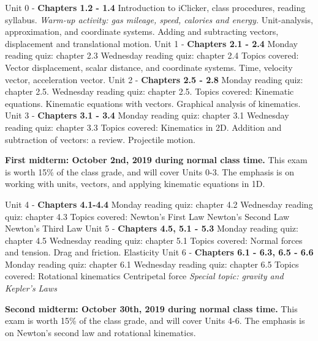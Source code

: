 \documentclass[10pt]{article}
\begin{document}
\begin{outline}[enumerate]
\1 Unit 0 - \textbf{Chapters 1.2 - 1.4}
\2 Introduction to iClicker, class procedures, reading syllabus.
\2 \textit{Warm-up activity: gas mileage, speed, calories and energy.}
\2 Unit-analysis, approximation, and coordinate systems.
\2 Adding and subtracting vectors, displacement and translational motion.
\1 Unit 1 - \textbf{Chapters 2.1 - 2.4}
\2 Monday reading quiz: chapter 2.3
\2 Wednesday reading quiz: chapter 2.4
\2 Topics covered:
\3 Vector displacement, scalar distance, and coordinate systems.
\3 Time, velocity vector, acceleration vector.
\1 Unit 2 - \textbf{Chapters 2.5 - 2.8}
\2 Monday reading quiz: chapter 2.5.
\2 Wednesday reading quiz: chapter 2.5.
\2 Topics covered:
\3 Kinematic equations.
\3 Kinematic equations with vectors.
\3 Graphical analysis of kinematics.
\1 Unit 3 - \textbf{Chapters 3.1 - 3.4}
\2 Monday reading quiz: chapter 3.1
\2 Wednesday reading quiz: chapter 3.3
\2 Topics covered:
\3 Kinematics in 2D.
\3 Addition and subtraction of vectors: a review.
\3 Projectile motion.

\1 \textbf{First midterm: October 2nd, 2019 during normal class time.} This exam is worth 15\% of the class grade, and will cover Units 0-3.  The emphasis is on working with units, vectors, and applying kinematic equations in 1D. 

\1 Unit 4 - \textbf{Chapters 4.1-4.4}
\2 Monday reading quiz: chapter 4.2
\2 Wednesday reading quiz: chapter 4.3
\2 Topics covered:
\3 Newton's First Law
\3 Newton's Second Law
\3 Newton's Third Law
\1 Unit 5 - \textbf{Chapters 4.5, 5.1 - 5.3}
\2 Monday reading quiz: chapter 4.5
\2 Wednesday reading quiz: chapter 5.1
\2 Topics covered:
\3 Normal forces and tension.
\3 Drag and friction.
\3 Elasticity
\1 Unit 6 - \textbf{Chapters 6.1 - 6.3, 6.5 - 6.6}
\2 Monday reading quiz: chapter 6.1
\2 Wednesday reading quiz: chapter 6.5
\2 Topics covered:
\3 Rotational kinematics
\3 Centripetal force
\3 \textit{Special topic: gravity and Kepler's Laws}

\1 \textbf{Second midterm: October 30th, 2019 during normal class time.} This exam is worth 15\% of the class grade, and will cover Units 4-6.  The emphasis is on Newton's second law and rotational kinematics.


\end{outline}
\end{document}
